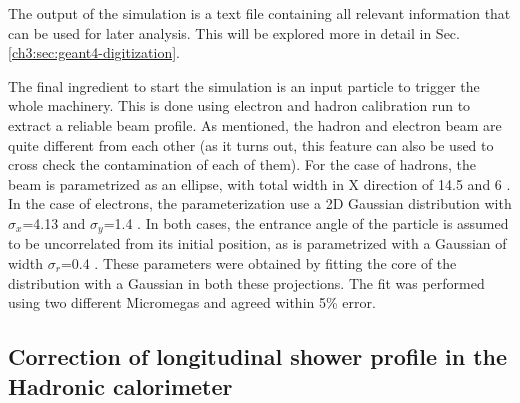 The output of the simulation is a text file containing all relevant information that can be used for later analysis. This will be explored more in detail in Sec.\ref{ch3:sec:geant4-digitization}.

The final ingredient to start the simulation is an input particle to trigger the whole machinery. This is done using electron and hadron calibration run to extract a reliable beam profile. As mentioned, the hadron and electron beam are quite different from each other (as it turns out, this feature can also be used to cross check the contamination of each of them). For the case of hadrons, the beam is parametrized as an ellipse, with total width in X direction of 14.5 \mmi and 6 \mmi. In the case of electrons, the parameterization use a 2D Gaussian distribution with $\sigma_x$=4.13 \mmi and $\sigma_y$=1.4 \mmi. In both cases, the entrance angle of the particle is assumed to be uncorrelated from its initial position, as is parametrized with a Gaussian of width $\sigma_r$=0.4 \mrad. These parameters were obtained by fitting the core of the distribution with a Gaussian in both these projections. The fit was performed using two different Micromegas and agreed within 5\% error. 

\subsection{Correction of longitudinal shower profile in the Hadronic calorimeter}
\label{ch3:sec:geant4-hcal-corr}

